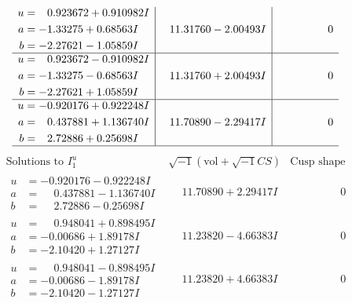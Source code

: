 \documentclass[1p]{elsarticle_modified}
\theoremstyle{definition}
\newcommand{\I}{\sqrt{-1}}
\begin{document}
$$\begin{array}{c|c|c}
\begin{aligned}
u &= \phantom{-}0.923672 + 0.910982 I \\
a &= -1.33275 + 0.68563 I \\
b &= -2.27621 - 1.05859 I\end{aligned}
 & \phantom{-}11.31760 - 2.00493 I & \phantom{-0.000000 } 0 \\ \hline\begin{aligned}
u &= \phantom{-}0.923672 - 0.910982 I \\
a &= -1.33275 - 0.68563 I \\
b &= -2.27621 + 1.05859 I\end{aligned}
 & \phantom{-}11.31760 + 2.00493 I & \phantom{-0.000000 } 0 \\ \hline\begin{aligned}
u &= -0.920176 + 0.922248 I \\
a &= \phantom{-}0.437881 + 1.136740 I \\
b &= \phantom{-}2.72886 + 0.25698 I\end{aligned}
 & \phantom{-}11.70890 - 2.29417 I & \phantom{-0.000000 } 0\\
 \hline 
 \end{array}$$\newpage$$\begin{array}{c|c|c}  
\text{Solutions to }I^u_{1}& \I (\text{vol} + \sqrt{-1}CS) & \text{Cusp shape}\\
 \hline 
\begin{aligned}
u &= -0.920176 - 0.922248 I \\
a &= \phantom{-}0.437881 - 1.136740 I \\
b &= \phantom{-}2.72886 - 0.25698 I\end{aligned}
 & \phantom{-}11.70890 + 2.29417 I & \phantom{-0.000000 } 0 \\ \hline\begin{aligned}
u &= \phantom{-}0.948041 + 0.898495 I \\
a &= -0.00686 + 1.89178 I \\
b &= -2.10420 + 1.27127 I\end{aligned}
 & \phantom{-}11.23820 - 4.66383 I & \phantom{-0.000000 } 0 \\ \hline\begin{aligned}
u &= \phantom{-}0.948041 - 0.898495 I \\
a &= -0.00686 - 1.89178 I \\
b &= -2.10420 - 1.27127 I\end{aligned}
 & \phantom{-}11.23820 + 4.66383 I & \phantom{-0.000000 } 0 \\ \hline\begin{aligned}

\end{aligned}
\end{array}$$
\end{document}
